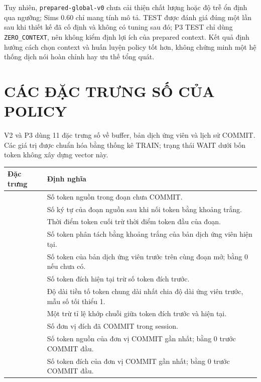 \documentclass[11pt,a4paper]{article}
\numberwithin{figure}{section}
\numberwithin{table}{section}
\begin{document}
Tuy nhiên, \texttt{prepared-global-v0} chưa cải thiện chất lượng hoặc độ trễ ổn định qua ngưỡng; Sims 0.60 chỉ mang tính mô tả. TEST được đánh giá đúng một lần sau khi thiết kế đã cố định và không có tuning sau đó; P3 TEST chỉ dùng \texttt{ZERO\_CONTEXT}, nên không kiểm định lợi ích của prepared context. Kết quả định hướng cách chọn context và huấn luyện policy tốt hơn, không chứng minh một hệ thống dịch nói hoàn chỉnh hay ưu thế tổng quát.

\FloatBarrier
{}
{}
\nocite{arivazhagan2019monotonic,ma2019stacl,ngo2022mtet,papi2022laal,papineni2002bleu,popovic2015chrf,reimers2019sentencebert,wang2020minilm}



\clearpage
\appendix

\section{CÁC ĐẶC TRƯNG SỐ CỦA POLICY}
V2 và P3 dùng 11 đặc trưng số về buffer, bản dịch ứng viên và lịch sử COMMIT. Các giá trị được chuẩn hóa bằng thống kê TRAIN; trạng thái WAIT dưới bốn token không xây dựng vector này.

\begin{center}
\small
\begin{tabularx}{\textwidth}{@{}L{0.37\textwidth}Y@{}}
  \toprule
  \textbf{Đặc trưng} & \textbf{Định nghĩa} \\
  \midrule
   & Số token nguồn trong đoạn chưa COMMIT. \\
   & Số ký tự của đoạn nguồn sau khi nối token bằng khoảng trắng. \\
   & Thời điểm token cuối trừ thời điểm token đầu của đoạn. \\
   & Số token phân tách bằng khoảng trắng của bản dịch ứng viên hiện tại. \\
   & Số token của bản dịch ứng viên trước trên cùng đoạn mở; bằng 0 nếu chưa có. \\
   & Số token đích hiện tại trừ số token đích trước. \\
   & Độ dài tiền tố token chung dài nhất chia độ dài ứng viên trước, mẫu số tối thiểu 1. \\
   & Một trừ tỉ lệ khớp chuỗi giữa token đích trước và hiện tại. \\
   & Số đơn vị đích đã COMMIT trong session. \\
   & Số token nguồn của đơn vị COMMIT gần nhất; bằng 0 trước COMMIT đầu. \\
   & Số token đích của đơn vị COMMIT gần nhất; bằng 0 trước COMMIT đầu. \\
  \bottomrule
\end{tabularx}
\end{center}
\end{document}
